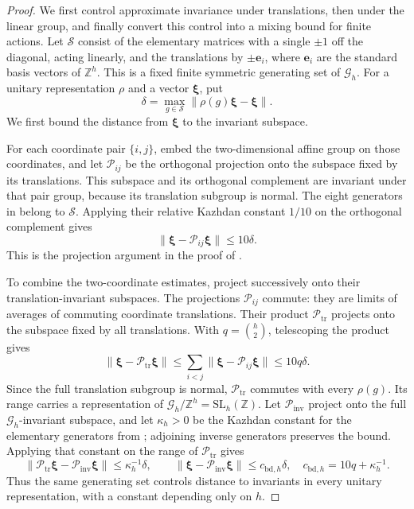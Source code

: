 \documentclass[11pt]{article}
\numberwithin{equation}{section}
\theoremstyle{definition}
\theoremstyle{remark}
\begin{document}
\begin{proof}
We first control approximate invariance under translations, then under the linear group, and finally convert this control into a mixing bound for finite actions. Let $\mathcal S$ consist of the elementary matrices with a single
$\pm1$ off the diagonal, acting linearly, and the translations by
$\pm {\mathbf{e}}_i$, where ${\mathbf{e}}_i$ are the standard basis vectors of $\mathbb Z^{h}$.
This is a fixed finite symmetric generating set of ${\mathcal{G}}_{h}$.
For a unitary representation $\rho$ and a vector $\boldsymbol{\xi}$, put
\[
\delta=\max_{g\in\mathcal S}\|\rho(g)\boldsymbol{\xi}-\boldsymbol{\xi}\|.
\]
We first bound the distance from $\boldsymbol{\xi}$ to the invariant subspace.

For each coordinate pair $\{i,j\}$, embed the two-dimensional affine
group on those coordinates, and let ${\mathcal{P}}_{ij}$ be the orthogonal projection
onto the subspace fixed by its translations. This subspace and its
orthogonal complement are invariant under that pair group, because its
translation subgroup is normal. The eight generators in
\cite[Theorem~2.1, p.~152]{Shalom1999} belong to $\mathcal S$. Applying their
relative Kazhdan constant $1/10$ on the orthogonal complement gives
\[
\|\boldsymbol{\xi}-{\mathcal{P}}_{ij}\boldsymbol{\xi}\|\le10\delta.
\]
This is the projection argument in the proof of
\cite[Corollary~2.3, p.~154]{Shalom1999}.

To combine the two-coordinate estimates, project successively onto their translation-invariant subspaces. The projections ${\mathcal{P}}_{ij}$ commute: they are limits of averages of
commuting coordinate translations. Their product ${\mathcal{P}}_{\mathrm{tr}}$ projects onto
the subspace fixed by all translations. With $q=\binom {h}2$, telescoping
the product gives
\[
\|\boldsymbol{\xi}-{\mathcal{P}}_{\mathrm{tr}}\boldsymbol{\xi}\|
\le\sum_{i<j}\|\boldsymbol{\xi}-{\mathcal{P}}_{ij}\boldsymbol{\xi}\|
\le10q\delta.
\]
Since the full translation subgroup is normal, ${\mathcal{P}}_{\mathrm{tr}}$ commutes
with every $\rho(g)$. Its range carries a representation of
${\mathcal{G}}_{h}/\mathbb Z^{h}=\mathrm{SL}_{h}(\mathbb Z)$. Let ${\mathcal{P}}_{\mathrm{inv}}$ project onto the
full ${\mathcal{G}}_{h}$-invariant subspace, and let $\kappa_{h}>0$ be the Kazhdan
constant for the elementary generators from
\cite[Theorem~2.6, p.~156]{Shalom1999}; adjoining inverse generators
preserves the bound. Applying that constant on the range of
${\mathcal{P}}_{\mathrm{tr}}$ gives
\[
\|{\mathcal{P}}_{\mathrm{tr}}\boldsymbol{\xi}-{\mathcal{P}}_{\mathrm{inv}}\boldsymbol{\xi}\|\le\kappa_{h}^{-1}\delta,
\qquad
\|\boldsymbol{\xi}-{\mathcal{P}}_{\mathrm{inv}}\boldsymbol{\xi}\|\le {c_{\mathrm{bd},h}}\delta,
\quad {c_{\mathrm{bd},h}}=10q+\kappa_{h}^{-1}.
\]
Thus the same generating set controls distance to invariants in every
unitary representation, with a constant depending only on ${h}$.


\end{proof}
\end{document}
